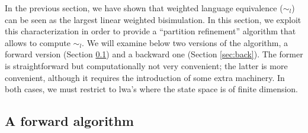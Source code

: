 \documentclass[3p]{elsarticle}
\newcommand{\lwa}{{\sc lwa}}           %
\begin{document}
In the previous section, we have shown that weighted language
equivalence ($\sim_l$) can be seen as the largest linear weighted
bisimulation.
%
In this section, we exploit this characterization in order to
provide a ``partition refinement'' algorithm that allows to compute
$\sim_l$. We will examine below two versions of the algorithm, a
forward version (Section \ref{sec:forwalg}) and a backward one
(Section \ref{sec:back}). The former is straightforward but
computationally not very convenient; the latter is more convenient,
although it requires the introduction of some extra machinery.
In both cases, we must restrict to \lwa's where the state space is of finite dimension.


\subsection{A forward algorithm}\label{sec:forwalg}
\end{document}

